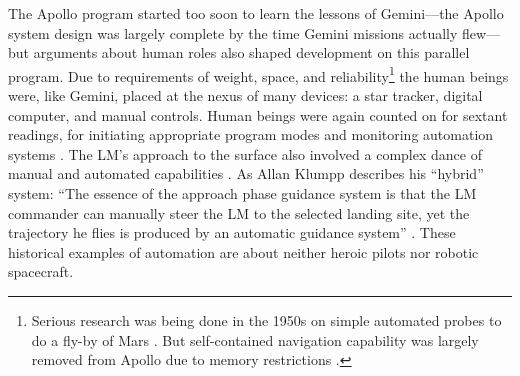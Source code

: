 The Apollo program started too soon to learn the lessons of
Gemini---the Apollo system design was largely complete by the time Gemini
missions actually flew---but arguments about human roles also shaped development on this
parallel program. Due to requirements of weight, space, and
reliability\footnote{Serious
research was being done in the 1950s on simple automated probes to do a fly-by of
Mars \cite[p. 1]{battin}. But self-contained navigation capability was
largely removed from Apollo due to memory restrictions
\cite{tindallMay12}.} the human beings were, like Gemini, placed at
the nexus of 
many devices: a star tracker, digital computer, and manual controls. Human beings were
again counted on for sextant readings, for initiating appropriate
program modes and monitoring automation systems \cite[p.
  4]{BennettExperience}. The LM's approach
to the surface also involved a complex dance of manual and automated
capabilities \cite{BennettCheatham}. As Allan Klumpp describes his
``hybrid'' system: ``The essence of the
approach phase guidance system is that the LM commander can manually
steer the LM to the selected landing site, yet the trajectory he flies
is produced by an automatic guidance system'' \cite[p.
  129--130]{Klumpp}. These 
historical examples of automation are about neither heroic pilots nor
robotic spacecraft.




